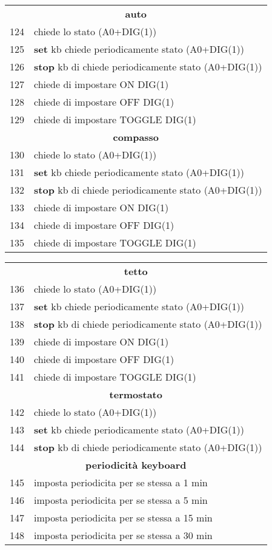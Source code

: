 \documentclass{article}
\begin{document}
\begin{tabular}{ll}
        \multicolumn{2}{c}{\textbf{auto}}\\
        124 & chiede lo stato (A0+DIG(1))\\
        125 & \textbf{set} kb chiede periodicamente stato (A0+DIG(1))\\
        126 & \textbf{stop} kb di chiede periodicamente stato (A0+DIG(1))\\
        127 & chiede di impostare ON DIG(1)     \\
        128 & chiede di impostare OFF DIG(1)    \\
        129 & chiede di impostare TOGGLE DIG(1) \\
        \multicolumn{2}{c}{\textbf{compasso}}\\
        130 & chiede lo stato (A0+DIG(1))\\
        131 & \textbf{set} kb chiede periodicamente stato (A0+DIG(1))\\
        132 & \textbf{stop} kb di chiede periodicamente stato (A0+DIG(1))\\
        133 & chiede di impostare ON DIG(1)     \\
        134 & chiede di impostare OFF DIG(1)    \\
        135 & chiede di impostare TOGGLE DIG(1) \\
    \end{tabular}    
    \newpage
    \begin{tabular}{ll}        
        \multicolumn{2}{c}{\textbf{tetto}}\\
        136 & chiede lo stato (A0+DIG(1))\\
        137 & \textbf{set} kb chiede periodicamente stato (A0+DIG(1))\\
        138 & \textbf{stop} kb di chiede periodicamente stato (A0+DIG(1))\\
        139 & chiede di impostare ON DIG(1)     \\
        140 & chiede di impostare OFF DIG(1)    \\
        141 & chiede di impostare TOGGLE DIG(1) \\
        \multicolumn{2}{c}{\textbf{termostato}}\\
        142 & chiede lo stato (A0+DIG(1))\\
        143 & \textbf{set} kb chiede periodicamente stato (A0+DIG(1))\\
        144 & \textbf{stop} kb di chiede periodicamente stato (A0+DIG(1))\\
        \multicolumn{2}{c}{\textbf{periodicità keyboard}}\\
        145 & imposta periodicita per se stessa a 1  min\\                
        146 & imposta periodicita per se stessa a 5  min\\
        147 & imposta periodicita per se stessa a 15 min\\                
        148 & imposta periodicita per se stessa a 30 min\\                
    \end{tabular}
\end{document}
